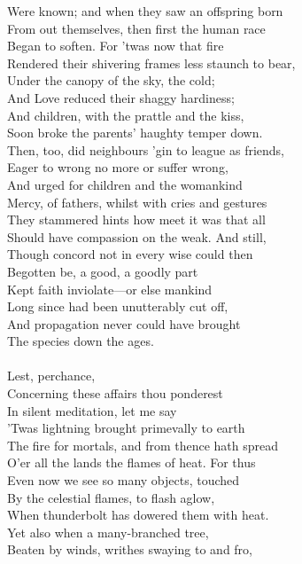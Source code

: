 Were known; and when they saw an offspring born\\
From out themselves, then first the human race\\
Began to soften. For 'twas now that fire\\
Rendered their shivering frames less staunch to bear,\\
Under the canopy of the sky, the cold;\\
And Love reduced their shaggy hardiness;\\
And children, with the prattle and the kiss,\\
Soon broke the parents' haughty temper down.\\
Then, too, did neighbours 'gin to league as friends,\\
Eager to wrong no more or suffer wrong,\\
And urged for children and the womankind\\
Mercy, of fathers, whilst with cries and gestures\\
They stammered hints how meet it was that all\\
Should have compassion on the weak. And still,\\
Though concord not in every wise could then\\
Begotten be, a good, a goodly part\\
Kept faith inviolate—or else mankind\\
Long since had been unutterably cut off,\\
And propagation never could have brought\\
The species down the ages.\\
\\
Lest, perchance,\\
Concerning these affairs thou ponderest\\
In silent meditation, let me say\\
'Twas lightning brought primevally to earth\\
The fire for mortals, and from thence hath spread\\
O'er all the lands the flames of heat. For thus\\
Even now we see so many objects, touched\\
By the celestial flames, to flash aglow,\\
When thunderbolt has dowered them with heat.\\
Yet also when a many-branched tree,\\
Beaten by winds, writhes swaying to and fro,\\
